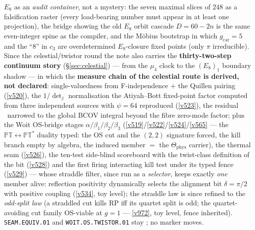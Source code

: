 
\maketitle
\vspace{-0.4cm}

\begin{keybox}
$E_8$ as an \emph{audit container}, not a mystery: the seven maximal slices of $248$ as a falsification
raster (every load-bearing number must appear in at least one projection), the bridge showing the old
$E_8$ orbit cascade $D{=}60{-}2n$ is the same even-integer spine as the compiler, and the M\"obius bootstrap
in which $g_{\mathrm{car}}=5$ and the ``$8$'' in $c_3$ are overdetermined $E_8$-closure fixed points (only
$\pi$ irreducible). Since the celestial/twistor round the note also carries the
\textbf{thirty-two-step continuum story} (\S\ref{sec:celestial}) --- from the $\mu_4$ clock to the
$(E_8)_1$ boundary shadow --- in which the \textbf{measure chain of the celestial route is
derived, not declared}: single-valuedness from F-independence $+$ the Quillen pairing
(\vref{v520}), the $1/\det_j$ normalisation the Atiyah--Bott fixed-point factor computed from
three independent sources with $\psi=64$ reproduced (\vref{v523}), the residual \mO\ narrowed to
the global BCOV integral beyond the fibre zero-mode factor; plus the Woit OS-bridge stages
$\alpha/\beta_1/\beta_2/\beta_3$ (\vref{v519}/\vref{v522}/\vref{v524}/\vref{v565} --- the
$\mathbb{PT}\leftrightarrow\mathbb{PT}^*$ duality typed: the OS cut and the $(2,2)$ signature
forced, the kill branch empty by algebra, the induced member $=$ the
$\Theta_{\mathrm{phys}}$ carrier), the thermal seam
(\vref{v526}), the ten-test side-blind scoreboard with the twist-class definition of the bit
(\vref{v528}) and the first firing interacting kill test under its typed fence (\vref{v529}) ---
whose straddle filter, since run as a \emph{selector}, keeps exactly \emph{one} member alive:
reflection positivity dynamically selects the alignment bit $\delta=\pi/2$ with positive coupling
(\vref{v534}, toy level); the straddle law is since refined to the \emph{odd-split law} (a
straddled cut kills RP iff its quartet split is odd; the quartet-avoiding cut family OS-viable
at $g=1$ --- \vref{v972}, toy level, fence inherited).
\texttt{SEAM.EQUIV.01} and \texttt{WOIT.OS.TWISTOR.01} stay \mO; no marker moves.
\end{keybox}

